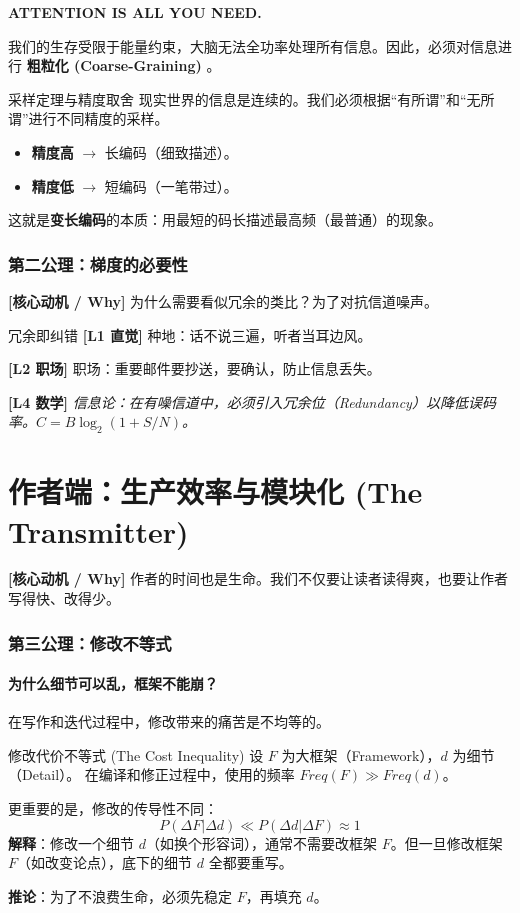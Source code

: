\documentclass[11pt, a4paper]{article}
\newcommand{\lowfreq}[1]{%
	{\Large\bfseries\color{red!40!black} #1}%
}
\newcommand{\motivation}[1]{%
	\begin{tcolorbox}[
		enhanced, frame hidden, colback=red!5, 
		borderline west={4pt}{0pt}{red!60!black},
		left=4pt, right=2pt, top=2pt, bottom=2pt
		]
		\textbf{\color{red!60!black} [核心动机 / Why]} #1
	\end{tcolorbox}
	\vspace{-0.5em}
}
\newcommand{\levelone}[1]{\noindent\textbf{\color{brown!80!black} [L1 直觉]} #1 \par}
\newcommand{\leveltwo}[1]{\noindent\textbf{\color{blue!60!black} [L2 职场]} #1 \par}
\newcommand{\levelfour}[1]{\noindent\textbf{\color{red!60!black} [L4 数学]} \textit{#1} \par}
\begin{document}
	\lowfreq{ATTENTION IS ALL YOU NEED.}
	
	我们的生存受限于能量约束，大脑无法全功率处理所有信息。因此，必须对信息进行\lowfreq{粗粒化 (Coarse-Graining)}。
	
	\begin{mathextension}{采样定理与精度取舍}
		现实世界的信息是连续的。我们必须根据“有所谓”和“无所谓”进行不同精度的采样。
		\begin{itemize}
			\item \textbf{精度高} $\rightarrow$ 长编码（细致描述）。
			\item \textbf{精度低} $\rightarrow$ 短编码（一笔带过）。
		\end{itemize}
		这就是\textbf{变长编码}的本质：用最短的码长描述最高频（最普通）的现象。
	\end{mathextension}
	
	\section{第二公理：梯度的必要性}
	\motivation{为什么需要看似冗余的类比？为了对抗信道噪声。}
	
	\begin{gradientbox}{冗余即纠错}
		\levelone{种地：话不说三遍，听者当耳边风。}
		\leveltwo{职场：重要邮件要抄送，要确认，防止信息丢失。}
		\levelfour{信息论：在有噪信道中，必须引入冗余位（Redundancy）以降低误码率。$C = B \log_2(1+S/N)$。}
	\end{gradientbox}
	
	\newpage
	
	\part{作者端：生产效率与模块化 (The Transmitter)}
	\motivation{作者的时间也是生命。我们不仅要让读者读得爽，也要让作者写得快、改得少。}
	
	\section{第三公理：修改不等式}
	\subsection{为什么细节可以乱，框架不能崩？}
	
	在写作和迭代过程中，修改带来的痛苦是不均等的。
	
	\begin{mathextension}{修改代价不等式 (The Cost Inequality)}
		设 $F$ 为大框架（Framework），$d$ 为细节（Detail）。
		在编译和修正过程中，使用的频率 $Freq(F) \gg Freq(d)$。
		
		更重要的是，修改的传导性不同：
		\begin{equation}
			P(\Delta F | \Delta d) \ll P(\Delta d | \Delta F) \approx 1
		\end{equation}
		\textbf{解释}：修改一个细节 $d$（如换个形容词），通常不需要改框架 $F$。但一旦修改框架 $F$（如改变论点），底下的细节 $d$ 全都要重写。
		
		\textbf{推论}：为了不浪费生命，必须先稳定 $F$，再填充 $d$。
	\end{mathextension}
	
\end{document}
